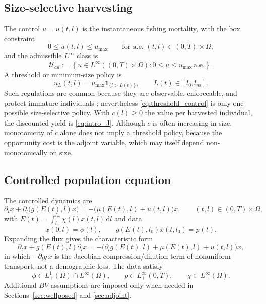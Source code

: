 \documentclass[pdflatex,sn-mathphys-num]{sn-jnl}
\newcommand{\Om}{\Omega}
\newcommand{\dd}{\,\mathrm{d}}
\newcommand{\Uad}{\mathcal{U}_{ad}}
\theoremstyle{plain}
\theoremstyle{definition}
\theoremstyle{remark}
\begin{document}
\subsection{Size-selective harvesting}
\label{subsec:harvesting}

The control $u=u(t,l)$ is the instantaneous fishing mortality, with the box
constraint
\[
0\le u(t,l)\le u_{\max}
\qquad
\text{for a.e.\ }(t,l)\in(0,T)\times\Om,
\]
and the admissible $L^\infty$ class is
\[
\Uad
:=
\left\{
u\in L^\infty((0,T)\times\Om):
0\le u\le u_{\max}\ \text{a.e.}
\right\}.
\]
A threshold or minimum-size policy is
\begin{equation}\label{eq:threshold_control}
u_L(t,l)
=
u_{\max}\mathbf 1_{\{l>L(t)\}},
\qquad L(t)\in[l_0,l_m].
\end{equation}
Such regulations are common because they are observable, enforceable, and protect
immature individuals \cite{ingram2006catch,wang2026breakdown}; nevertheless
\eqref{eq:threshold_control} is only one possible size-selective policy. With
$c(l)\ge0$ the value per harvested individual, the discounted yield is
\eqref{eq:intro_J}. Although $c$ is often increasing in size, monotonicity of $c$
alone does not imply a threshold policy, because the opportunity cost is the
adjoint variable, which may itself depend non-monotonically on size.

\subsection{Controlled population equation}
\label{subsec:state_equation}

The controlled dynamics are
\begin{equation}\label{eq:state}
\partial_t x
+
\partial_l\!\big(g(E(t),l)x\big)
=
-\big(\mu(E(t),l)+u(t,l)\big)x,
\qquad
(t,l)\in(0,T)\times\Om,
\end{equation}
with $E(t)=\int_{l_0}^{l_m}\chi(l)x(t,l)\dd l$ and data
\begin{equation}\label{eq:state_data}
x(0,l)=\phi(l),
\qquad
g(E(t),l_0)x(t,l_0)=p(t).
\end{equation}
Expanding the flux gives the characteristic form
\[
\partial_t x
+
g(E(t),l)\partial_lx
=
-\big(
\partial_lg(E(t),l)
+
\mu(E(t),l)
+
u(t,l)
\big)x,
\]
in which $-\partial_l g\,x$ is the Jacobian compression/dilution term of nonuniform
transport, not a demographic loss. The data satisfy
\[
\phi\in L^1_+(\Om)\cap L^\infty(\Om),
\qquad
p\in L^\infty_+(0,T),
\qquad
\chi\in L^\infty_+(\Om).
\]
Additional $BV$ assumptions are imposed only when needed in
Sections~\ref{sec:wellposed} and \ref{sec:adjoint}.
\end{document}
